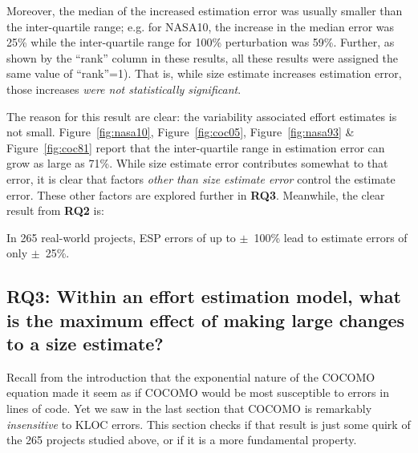 \documentclass[final,twocolumn]{elsarticle}
\newcommand{\fig}[1]{Figure~\ref{fig:#1}}
\theoremstyle{break}
\begin{document}
Moreover, the median of the increased estimation error was usually smaller than
the inter-quartile range; e.g. for NASA10, the increase in the median error was
25\% while the inter-quartile range for 100\% perturbation was 59\%. Further, as
shown by the ``rank'' column in these results, all these results
were assigned the same value of ``rank''=1).
That is, while size estimate increases estimation error, those increases
{\em were not statistically significant}.

The reason for this result are clear: the variability associated effort estimates is not small.
\fig{nasa10}, \fig{coc05}, \fig{nasa93} \& \fig{coc81} report that the inter-quartile range in estimation error
can grow as large as 71\%. While size estimate error contributes somewhat to that error, it is clear
that  factors {\em other than size estimate error} control the estimate error.
These other factors are explored further in {\bf RQ3}. Meanwhile,
the clear result from {\bf RQ2} is:
\begin{lesson}
  In 265 real-world projects,
  ESP errors of up to $\pm$~100\% lead to estimate errors of only $\pm$~25\%.
\end{lesson}

\subsection{ RQ3:
  Within an effort estimation model,
  what is the maximum effect of making large changes to a size estimate?}

 Recall from the introduction that the exponential nature of the COCOMO equation
 made it seem as if COCOMO would be most susceptible to errors in lines of code.
 Yet we saw in the last section that COCOMO is remarkably {\em insensitive} to
 KLOC errors.  This section checks if that result is just some quirk of the 265
 projects studied above, or if it is a more fundamental property. 
\end{document}

